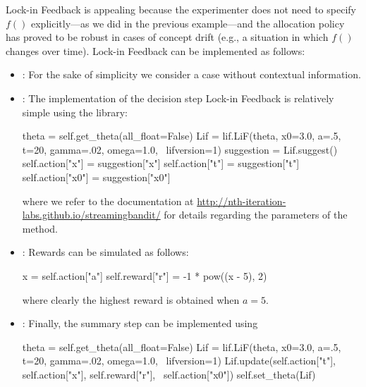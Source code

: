 \documentclass[nojss]{jss}
\begin{document}
Lock-in Feedback is appealing because the experimenter does not need to specify $f()$ explicitly---as we did in the previous example---and the allocation policy has proved to be robust in cases of concept drift (e.g., a situation in which $f()$ changes over time). Lock-in Feedback can be implemented as follows:
\begin{itemize}
\item {}: For the sake of simplicity we consider a case without contextual information.
\item {}: The implementation of the decision step Lock-in Feedback is relatively simple using the  library:
\begin{Code}
theta = self.get_theta(all_float=False)
Lif = lif.LiF(theta, x0=3.0, a=.5, t=20, gamma=.02, omega=1.0, \
  lifversion=1)
suggestion = Lif.suggest()
self.action["x"] = suggestion["x"]
self.action["t"] = suggestion["t"]
self.action["x0"] = suggestion["x0"]
\end{Code}
where we refer to the  documentation at \url{http://nth-iteration-labs.github.io/streamingbandit/} for details regarding the parameters of the  method. 

\item {}: Rewards can be simulated as follows:
\begin{Code}
x = self.action["a"]
self.reward["r"] = -1 * pow((x - 5), 2)
\end{Code}
where clearly the highest reward is obtained when $a = 5$.

\item {}: Finally, the summary step can be implemented using
\begin{Code}
theta = self.get_theta(all_float=False)
Lif = lif.LiF(theta, x0=3.0, a=.5, t=20, gamma=.02, omega=1.0, \
  lifversion=1)
Lif.update(self.action["t"], self.action["x"], self.reward["r"], \
  self.action["x0"])
self.set_theta(Lif)
\end{Code}

\end{itemize}
\end{document}
